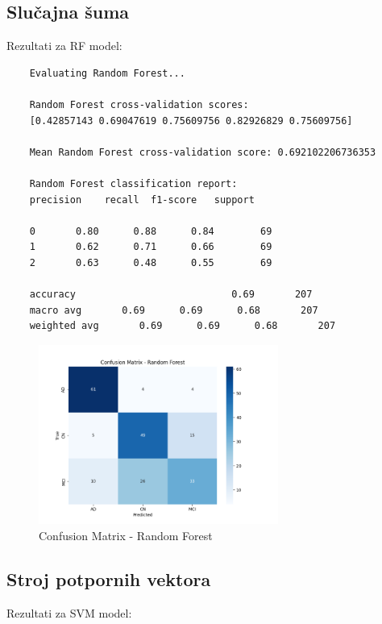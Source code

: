 \documentclass[zavrsnirad,upload]{fer}
\begin{document}
\subsection{Slučajna šuma}

Rezultati za RF model:

\begin{verbatim}
	Evaluating Random Forest...
	
	Random Forest cross-validation scores: 
	[0.42857143 0.69047619 0.75609756 0.82926829 0.75609756]
	
	Mean Random Forest cross-validation score: 0.692102206736353
	
	Random Forest classification report:
	precision    recall  f1-score   support
	
	0       0.80      0.88      0.84        69
	1       0.62      0.71      0.66        69
	2       0.63      0.48      0.55        69
	
	accuracy                           0.69       207
	macro avg       0.69      0.69      0.68       207
	weighted avg       0.69      0.69      0.68       207
\end{verbatim}

\begin{figure}[h]
	\centering
	\includegraphics[width=0.7\textwidth]{Figures/matrix_rf.png}
	\caption{Confusion Matrix - Random Forest}
	\label{fig:matrix_rf}
\end{figure}

\subsection{Stroj potpornih vektora}

Rezultati za SVM model:
\end{document}
